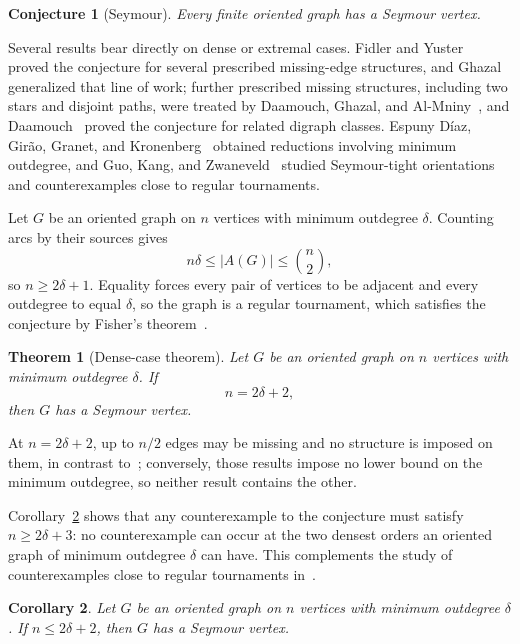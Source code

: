 \documentclass[12pt]{article}
\theoremstyle{plainsl}
\newtheorem{theorem}{Theorem}[section]
\newtheorem{corollary}[theorem]{Corollary}
\newtheorem*{conjecture}{Conjecture}
\theoremstyle{remark}
\begin{document}
\begin{conjecture}[Seymour]
Every finite oriented graph has a Seymour vertex.
\end{conjecture}

Several results bear directly on dense or extremal cases.  Fidler and
Yuster~\cite{FidlerYuster2007} proved the conjecture for several prescribed
missing-edge structures, and Ghazal~\cite{Ghazal2012} generalized that line of
work; further prescribed missing structures, including two stars and disjoint
paths, were treated by Daamouch, Ghazal, and
Al-Mniny~\cite{DaamouchGhazalAlMniny2024}, and Daamouch~\cite{Daamouch2021}
proved the conjecture for related digraph classes.  Espuny D\'iaz, Gir\~ao,
Granet, and Kronenberg~\cite{EspunyDiazEtAl2024} obtained reductions involving
minimum outdegree, and Guo, Kang, and Zwaneveld~\cite{GuoKangZwaneveld2026}
studied Seymour-tight orientations and counterexamples close to regular
tournaments.

Let $G$ be an oriented graph on $n$ vertices with minimum outdegree $\delta$. Counting arcs by their sources gives
\[
 n\delta\le|A(G)|\le\binom n2,
\]
so $n\ge2\delta+1$. Equality forces every pair of vertices to be adjacent and every outdegree to equal $\delta$, so the graph is a regular tournament, which satisfies the conjecture by Fisher's theorem~\cite{Fisher1996}.


\begin{theorem}[Dense-case theorem]\label{thm:fixed-target}
Let $G$ be an oriented graph on $n$ vertices with minimum outdegree $\delta$.
If
\[
 n=2\delta+2,
\]
then $G$ has a Seymour vertex.
\end{theorem}

At $n=2\delta+2$, up to $n/2$ edges may be missing and no structure is
imposed on them, in contrast
to~\cite{Daamouch2021,DaamouchGhazalAlMniny2024,FidlerYuster2007,Ghazal2012};
conversely, those results impose no lower bound on the minimum outdegree, so
neither result contains the other.

Corollary~\ref{cor:dense-case} shows that any counterexample to the
conjecture must satisfy $n\ge2\delta+3$: no counterexample can occur at the
two densest orders an oriented graph of minimum outdegree $\delta$ can have.
This complements the study of counterexamples close to regular tournaments
in~\cite{GuoKangZwaneveld2026}.

\begin{corollary}\label{cor:dense-case}
Let $G$ be an oriented graph on $n$ vertices with minimum outdegree $\delta$.
If $n\le2\delta+2$, then $G$ has a Seymour vertex.
\end{corollary}
\end{document}
